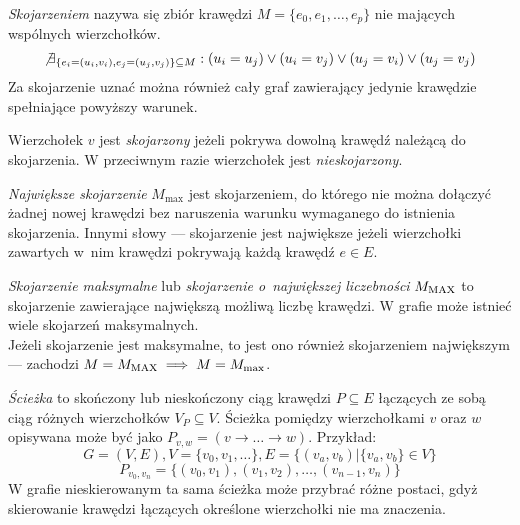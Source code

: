 \begin{definition}
  \emph{Skojarzeniem} nazywa się zbiór krawędzi $M=\{e_0, e_1, \ldots, e_p\}$
  nie mających wspólnych wierzchołków.
  \[\not\exists_{\{e_i=(u_i,v_i), e_j=(u_j, v_j)\} \subseteq M}: (u_i=u_j) \lor (u_i=v_j) \lor (u_j=v_i) \lor (u_j=v_j)\]
  Za skojarzenie uznać można również cały graf zawierający jedynie krawędzie
  spełniające powyższy warunek.
\end{definition}

\begin{definition}
  Wierzchołek $v$ jest \emph{skojarzony} jeżeli pokrywa dowolną krawędź należącą do skojarzenia.
  W przeciwnym razie wierzchołek jest \emph{nieskojarzony}.
\end{definition}

\begin{definition}
  \emph{Największe skojarzenie} $M_{\max}$ jest skojarzeniem, do którego nie można
  dołączyć żadnej nowej krawędzi bez naruszenia warunku wymaganego do istnienia
  skojarzenia. 
  Innymi słowy --- skojarzenie jest największe jeżeli wierzchołki zawartych w~nim
  krawędzi pokrywają każdą krawędź $e \in E$.
\end{definition}

\begin{definition}
  \emph{Skojarzenie maksymalne} lub \emph{skojarzenie o~największej liczebności}
  $M_{\textnormal{MAX}}$ to skojarzenie zawierające największą możliwą liczbę krawędzi.
  W grafie może istnieć wiele skojarzeń maksymalnych.\\
  Jeżeli skojarzenie jest maksymalne, to jest ono również skojarzeniem największym --- zachodzi $M=M_{\textnormal{MAX}} \implies M=M_{\max}$.
\end{definition}

\begin{definition}
  \emph{Ścieżka} to skończony lub nieskończony ciąg krawędzi 
  $P \subseteq E$ łączących ze sobą ciąg różnych wierzchołków $V_P \subseteq V$.
  Ścieżka pomiędzy wierzchołkami $v$ oraz $w$ opisywana może być jako $P_{v,w} = (v \rightarrow \ldots \rightarrow w)$.
  Przykład:
  \[G=(V,E), V=\{v_0, v_1, \ldots\}, E=\{(v_a, v_b)| \{v_a, v_b\} \in V\}\]
  \[P_{v_0, v_n}=\{(v_0, v_1), (v_1, v_2), \ldots, (v_{n-1}, v_n)\}\]
  W grafie nieskierowanym ta sama ścieżka może przybrać różne postaci, gdyż
  skierowanie krawędzi łączących określone wierzchołki nie ma znaczenia.
\end{definition}

